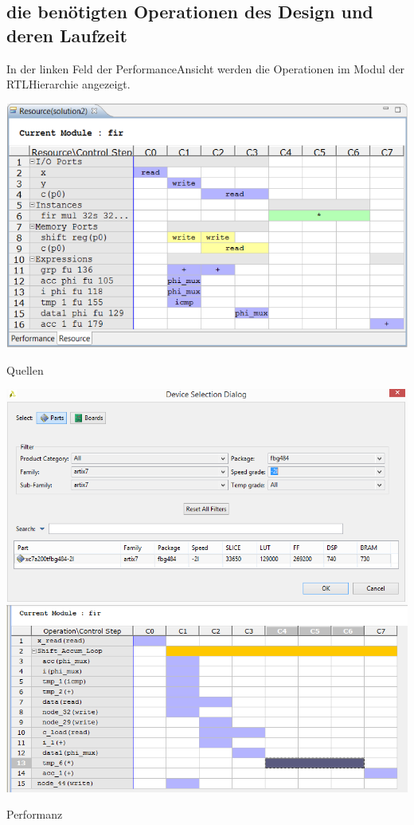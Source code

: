 \subsection {die benötigten Operationen des Design und deren Laufzeit}
In der linken Feld der Performance\-Ansicht werden die Operationen im Modul der RTL\-Hierarchie angezeigt.\\


\begin{minipage}{\textwidth}
    \begin{center}        
        \includegraphics[scale=0.64]{img/Resource.png} 
    \end{center}
\end{minipage}
\begin{center}
Quellen
\end{center}
\begin{minipage}{\textwidth}
    \begin{center}        
        \includegraphics[scale=0.7]{img/simu.png} 
    \end{center}
\end{minipage}
\begin{center}
Performanz
\end{center}

